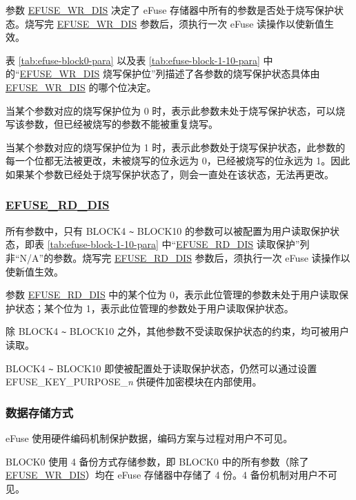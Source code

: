 \documentclass[main\_\_CN.tex]{subfiles}
\begin{document}
参数 \hyperref[fielddesc:EFUSEWRDIS]{EFUSE\_WR\_DIS} 决定了 eFuse 存储器中所有的参数是否处于烧写保护状态。烧写完 \hyperref[fielddesc:EFUSEWRDIS]{EFUSE\_WR\_DIS} 参数后，须执行一次 eFuse 读操作以使新值生效。

表 \ref{tab:efuse-block0-para} 以及表 \ref{tab:efuse-block-1-10-para} 中的“\hyperref[fielddesc:EFUSEWRDIS]{EFUSE\_WR\_DIS} 烧写保护位”列描述了各参数的烧写保护状态具体由 \hyperref[fielddesc:EFUSEWRDIS]{EFUSE\_WR\_DIS} 的哪个位决定。

当某个参数对应的烧写保护位为 0 时，表示此参数未处于烧写保护状态，可以烧写该参数，但已经被烧写的参数不能被重复烧写。

当某个参数对应的烧写保护位为 1 时，表示此参数处于烧写保护状态，此参数的每一个位都无法被更改，未被烧写的位永远为 0，已经被烧写的位永远为 1。因此如果某个参数已经处于烧写保护状态了，则会一直处在该状态，无法再更改。

\subsubsection{\hyperref[fielddesc:EFUSERDDIS]{EFUSE\_RD\_DIS}}
\label{sec:efuse-rd-dis}

所有参数中，只有 BLOCK4 \verb+~+ BLOCK10 的参数可以被配置为用户读取保护状态，即表 \ref{tab:efuse-block-1-10-para} 中“\hyperref[fielddesc:EFUSERDDIS]{EFUSE\_RD\_DIS} 读取保护”列非“N/A”的参数。烧写完 \hyperref[fielddesc:EFUSERDDIS]{EFUSE\_RD\_DIS} 参数后，须执行一次 eFuse 读操作以使新值生效。

参数 \hyperref[fielddesc:EFUSERDDIS]{EFUSE\_RD\_DIS} 中的某个位为 0，表示此位管理的参数未处于用户读取保护状态；某个位为 1，表示此位管理的参数处于用户读取保护状态。

除 BLOCK4 \verb+~+ BLOCK10 之外，其他参数不受读取保护状态的约束，均可被用户读取。

BLOCK4 \verb+~+ BLOCK10 即使被配置处于读取保护状态，仍然可以通过设置 EFUSE\_KEY\_PURPOSE\_\textcolor{myred}{\it{n}} 供硬件加密模块在内部使用。

\subsubsection{数据存储方式}
\label{sec:efuse-data-storage}

eFuse 使用硬件编码机制保护数据，编码方案与过程对用户不可见。

BLOCK0 使用 4 备份方式存储参数，即 BLOCK0 中的所有参数（除了 \hyperref[fielddesc:EFUSEWRDIS]{EFUSE\_WR\_DIS}）均在 eFuse 存储器中存储了 4 份。4 备份机制对用户不可见。
\end{document}
